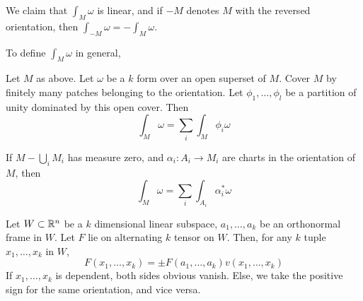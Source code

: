 \documentclass[12pt]{article}
\begin{document}
\begin{lem}
    We claim that $\int_M\omega$ is linear, and if $-M$ denotes $M$ with the reversed orientation, then $\int_{-M}\omega = -\int_M\omega$.
\end{lem}

To define $\int_M\omega$ in general,

\begin{defn}
    Let $M$ as above. Let $\omega$ be a $k$ form over an open superset of $M$. Cover $M$ by finitely many patches belonging to the orientation. Let $\phi_1, \dots, \phi_l$ be a partition of unity dominated by this open cover. Then
    $$\int_M\omega = \sum_i \int_M \phi_i\omega$$
\end{defn}

If $M - \bigcup_i M_i$ has measure zero, and $\alpha_i: A_i \rightarrow M_i$ are charts in the orientation of $M$, then
$$\int_M\omega = \sum_i \int_{A_i}\alpha_i^*\omega$$

\begin{thm}
    Let $W \subset \mathbb{R}^n$ be a $k$ dimensional linear subspace, $a_1, \dots, a_k$ be an orthonormal frame in $W$. Let $F$ lie on alternating $k$ tensor on $W$. Then, for any $k$ tuple $x_1, \dots, x_k$ in $W$,
    $$F(x_1,\dots,x_k) = \pm F(a_1,\dots,a_k)v(x_1,\dots,x_k)$$
    If $x_1,\dots,x_k$ is dependent, both sides obvious vanish. Else, we take the positive sign for the same orientation, and vice versa.
\end{thm}
\end{document}
